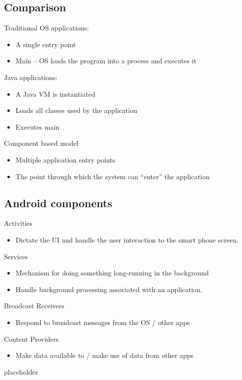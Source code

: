 \documentclass{article}
\begin{document}
\begin{multicols}{2}

\subsection{Comparison}

\begin{flushleft}
Traditional OS applications:
\begin{itemize}
  \item A single entry point
  \item Main – OS loads the program into a process and executes it
\end{itemize}
Java applications:
\begin{itemize}
  \item A Java VM is instantiated
  \item Loads all classes used by the application
  \item Executes main
\end{itemize}
Component based model
\begin{itemize}
  \item Multiple application entry points
  \item The point through which the system can “enter” the application
\end{itemize}
\end{flushleft}

\smallskip
\subsection{Android components}

Activities
\begin{itemize}
  \item Dictate the UI and handle the user interaction to the smart phone screen.
\end{itemize}
Services
\begin{itemize}
  \item Mechanism for doing something long-running in the
background
  \item Handle background processing associated with an application.
\end{itemize}
Broadcast Receivers
\begin{itemize}
  \item Respond to broadcast messages from the OS / other
apps
\end{itemize}
Content Providers
\begin{itemize}
  \item Make data available to / make use of data from other
apps
\end{itemize}

\end{multicols}

\newpage

\begin{description}
	\item[placeholder] \hfill \\
\end{description}
\end{document}
